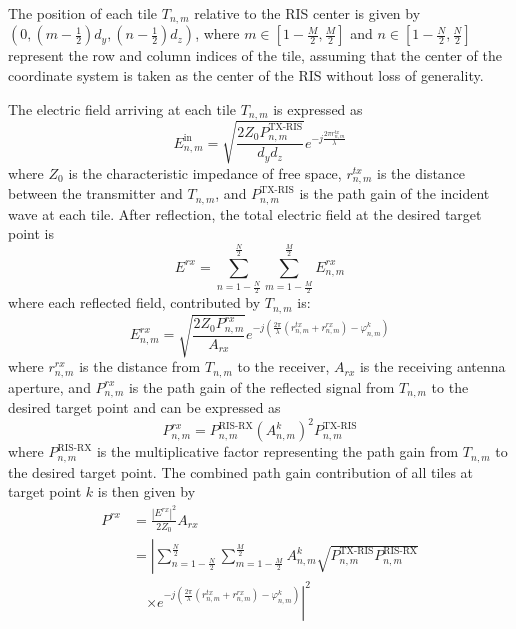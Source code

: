 \documentclass{IEEEoj}
\begin{document}
The position of each tile $T_{n,m}$ relative to the RIS center is given by $(0, (m-\frac{1}{2})d_y, (n-\frac{1}{2})d_z)$, where $m \in \left[ 1 - \frac{M}{2}, \frac{M}{2} \right]$ and $n \in \left[ 1 - \frac{N}{2}, \frac{N}{2} \right]$ represent the row and column indices of the tile, assuming that the center of the coordinate system is taken as the center of the RIS without loss of generality.

The electric field arriving at each tile $T_{n,m}$ is expressed as
\begin{equation}
	E_{n,m}^{\text{in}} = \sqrt{\frac{2 Z_0 P_{n,m}^{\text{TX-RIS}}}{d_y d_z}} e^{-j \frac{2 \pi r_{n,m}^{tx}}{\lambda}}
\end{equation}
where $Z_0$ is the characteristic impedance of free space, $r_{n,m}^{tx}$ is the distance between the transmitter and $T_{n,m}$, and $P_{n,m}^{\text{TX-RIS}}$ is the path gain of the incident wave at each tile. After reflection, the total electric field at the desired target point is
\begin{equation}
	E^{rx} = \sum_{n=1-\frac{N}{2}}^{\frac{N}{2}} \sum_{m=1-\frac{M}{2}}^{\frac{M}{2}} E_{n,m}^{rx}
\end{equation}
where each reflected field, contributed by $T_{n,m}$ is:
\begin{equation} \label{E_n_m_r}
	E_{n,m}^{rx} = \sqrt{\frac{2 Z_0 P^{rx}_{n,m}}{A_{rx}}} e^{-j \left(\frac{2 \pi}{\lambda} (r_{n,m}^{tx} + r_{n,m}^{rx}) - \varphi_{n,m}^k\right)}
\end{equation}
where $r_{n,m}^{rx}$ is the distance from $T_{n,m}$ to the receiver, $A_{rx}$ is the receiving antenna aperture, and $P_{n,m}^{rx}$ is the path gain of the reflected signal from $T_{n,m}$ to the desired target point and can be expressed as
\begin{equation}
	P_{n,m}^{rx} = P_{n,m}^{\text{RIS-RX}} (A_{n,m}^k)^2 P_{n,m}^{\text{TX-RIS}}
\end{equation}
where $P_{n,m}^{\text{RIS-RX}}$ is the multiplicative factor representing the path gain from $T_{n,m}$ to the desired target point. The combined path gain contribution of all tiles at target point $k$ is then given by
\begin{equation} \label{combined_rx_power}
	\begin{aligned}
		P^{rx} &= \frac{\left|E^{rx}\right|^2}{2 Z_0} A_{rx} \\
		&= \left| \sum_{n=1-\frac{N}{2}}^{\frac{N}{2}} \sum_{m=1-\frac{M}{2}}^{\frac{M}{2}} A_{n,m}^k \sqrt{P_{n,m}^{\text{TX-RIS}} P_{n,m}^{\text{RIS-RX}}} \right. \\
		&\quad \left. \times e^{-j \left(\frac{2 \pi}{\lambda} (r_{n,m}^{tx} + r_{n,m}^{rx}) - \varphi_{n,m}^k\right)} \right|^2
	\end{aligned}
\end{equation}
\end{document}
